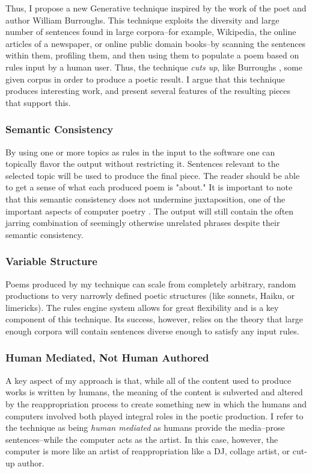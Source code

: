 \documentclass[10pt]{article}
\begin{document}
Thus, I propose a new Generative technique inspired by the work of the poet and
author William Burroughs. This technique exploits the diversity and large
number of sentences found in large corpora--for example, Wikipedia, the online
articles of a newspaper, or online public domain books--by scanning the
sentences within them, profiling them, and then using them to populate a poem
based on rules input by a human user. Thus, the technique \emph{cuts up}, like
Burroughs \cite{wikiCutup}, some given corpus in order to produce a poetic
result. I argue that this technique produces interesting work, and present
several features of the resulting pieces that support this.

\subsubsection{Semantic Consistency}
By using one or more topics as rules in the input to the software one can
topically flavor the output without restricting it. Sentences relevant to the
selected topic will be used to produce the final piece. The reader should be
able to get a sense of what each produced poem is "about." It is important to
note that this semantic consistency does not undermine juxtaposition, one of
the important aspects of computer poetry \cite{Hart96}. The output will still
contain the often jarring combination of seemingly otherwise unrelated phrases
despite their semantic consistency.

\subsubsection{Variable Structure}
Poems produced by my technique can scale from completely arbitrary, random
productions to very narrowly defined poetic structures (like sonnets, Haiku, or
limericks). The rules engine system allows for great flexibility and is a key
component of this technique. Its success, however, relies on the theory that
large enough corpora will contain sentences diverse enough to satisfy any input
rules.

\subsubsection{Human Mediated, Not Human Authored}
A key aspect of my approach is that, while all of the content used to produce
works is written by humans, the meaning of the content is subverted and altered
by the reappropriation process to create something new in which the humans and
computers involved both played integral roles in the poetic production. I refer
to the technique as being \emph{human mediated} as humans provide the
media--prose sentences--while the computer acts as the artist. In this case,
however, the computer is more like an artist of reappropriation like a DJ,
collage artist, or cut-up author.
\end{document}
